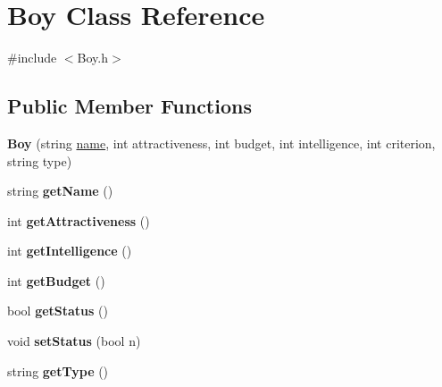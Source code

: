 \hypertarget{class_boy}{}\section{Boy Class Reference}
\label{class_boy}


{\ttfamily \#include $<$Boy.\+h$>$}

\subsection*{Public Member Functions}
\begin{DoxyCompactItemize}
\item 
{\bfseries Boy} (string \hyperlink{class_boy_a8649f275f6428267fad0234866c1ccfa}{name}, int attractiveness, int budget, int intelligence, int criterion, string type)\hypertarget{class_boy_a2685e245c0aba069ec1ff62cf4ab332a}{}\label{class_boy_a2685e245c0aba069ec1ff62cf4ab332a}

\item 
string {\bfseries get\+Name} ()\hypertarget{class_boy_a53e90a641c928c0849e33eca847e902d}{}\label{class_boy_a53e90a641c928c0849e33eca847e902d}

\item 
int {\bfseries get\+Attractiveness} ()\hypertarget{class_boy_a814ef4919f2ac86c6ee70f9698afad3d}{}\label{class_boy_a814ef4919f2ac86c6ee70f9698afad3d}

\item 
int {\bfseries get\+Intelligence} ()\hypertarget{class_boy_ad52c9e04ab591f3909d2342d6cae0168}{}\label{class_boy_ad52c9e04ab591f3909d2342d6cae0168}

\item 
int {\bfseries get\+Budget} ()\hypertarget{class_boy_a05c48b12091ebcad44ba86ba88514ac5}{}\label{class_boy_a05c48b12091ebcad44ba86ba88514ac5}

\item 
bool {\bfseries get\+Status} ()\hypertarget{class_boy_addae09f4e721049288d809a5df51354c}{}\label{class_boy_addae09f4e721049288d809a5df51354c}

\item 
void {\bfseries set\+Status} (bool n)\hypertarget{class_boy_ae54cf47993bc53efd0fff515d53253d3}{}\label{class_boy_ae54cf47993bc53efd0fff515d53253d3}

\item 
string {\bfseries get\+Type} ()\hypertarget{class_boy_a7a929a12a6b19d1f1301a4bc6a5653eb}{}\label{class_boy_a7a929a12a6b19d1f1301a4bc6a5653eb}


\end{DoxyCompactItemize}
